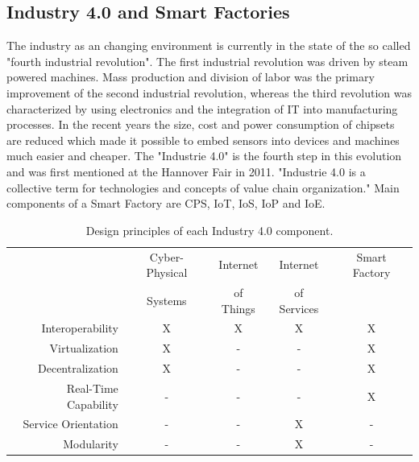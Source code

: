 \subsection{Industry 4.0 and Smart Factories}

The industry as an changing environment is currently in the state of the so called "fourth industrial revolution".
The first industrial revolution was driven by steam powered machines.
Mass production and division of labor was the primary improvement of the second industrial revolution, whereas the third revolution was characterized by using electronics and the integration of \ac{IT} into manufacturing processes.\cite[p. 1]{Lom2016}
In the recent years the size, cost and power consumption of chipsets are reduced which made it possible to embed sensors into devices and machines much easier and cheaper.\cite[p. 1]{Brito2016}
The "Industrie 4.0" is the fourth step in this evolution and was first mentioned at the Hannover Fair in 2011.\cite[p. 1]{Lom2016}
"Industrie 4.0 is a collective term for technologies and concepts of value chain organization."\cite[p. 11]{Her2015}
Main components of a Smart Factory are \ac{CPS}, \ac{IoT}, \ac{IoS}, \ac{IoP} and \ac{IoE}.\cite[p. 11]{Her2015}

\begin{table}[htpb]
  \centering
  \begin{tabular}{| r | c c c c |}
  	\rowcolor{dunkelgrau}
  	\hline
  	                      & Cyber-Physical & Internet  & Internet    & Smart Factory \\
    \rowcolor{dunkelgrau}
                          & Systems        & of Things & of Services &  \\
  	\hline
  	Interoperability      & X        & X        & X          & X    \\
  	Virtualization        & X        & -        & -          & X    \\
    Decentralization      & X        & -        & -          & X    \\
    Real-Time Capability  & -        & -        & -          & X    \\
    Service Orientation   & -        & -        & X          & -    \\
    Modularity            & -        & -        & X          & -    \\
  	\hline
  \end{tabular}
  \caption[Design principles of each Industry 4.0 component]{Design principles of each Industry 4.0 component.\cite[p. 11]{Her2015}}
  \label{tab:industryComponents}
\end{table}

